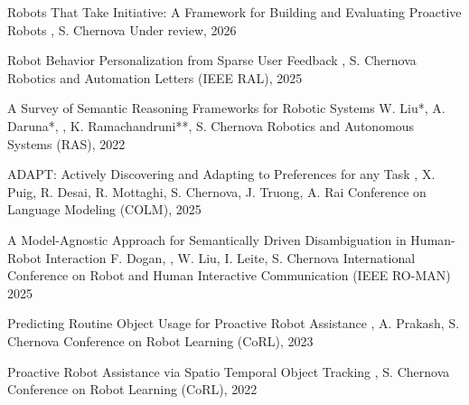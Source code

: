 

\begin{cvpubs}

  \cvpub
    {Robots That Take Initiative: A Framework for Building and Evaluating Proactive Robots} %
    {, S. Chernova} %
    {Under review, 2026} %
    {\bullet} %

  \cvpub
    {Robot Behavior Personalization from Sparse User Feedback} %
    {, S. Chernova} %
    {Robotics and Automation Letters (IEEE RAL), 2025} %
    {\bullet} %

  \cvpub
    {A Survey of Semantic Reasoning Frameworks for Robotic Systems} %
    {W. Liu*, A. Daruna*, , K. Ramachandruni**, S. Chernova} %
    {Robotics and Autonomous Systems (RAS), 2022} %
    {\bullet} %

\end{cvpubs}



\begin{cvpubs}

    \cvpub
    {ADAPT: Actively Discovering and Adapting to Preferences for any Task} %
    {, X. Puig, R. Desai, R. Mottaghi, S. Chernova, J. Truong, A. Rai} %
    {Conference on Language Modeling (COLM), 2025} %
    {\bullet}

    \cvpub
    {A Model-Agnostic Approach for Semantically Driven Disambiguation in Human-Robot Interaction} %
    {F. Dogan, , W. Liu, I. Leite, S. Chernova} %
    {International Conference on Robot and Human Interactive Communication (IEEE RO-MAN) 2025} %
    {\bullet}

   \cvpub
    {Predicting Routine Object Usage for Proactive Robot Assistance} %
    {, A. Prakash, S. Chernova} %
    {Conference on Robot Learning (CoRL), 2023} %
    {\bullet} %
    
  \cvpub
    {Proactive Robot Assistance via Spatio Temporal Object Tracking} %
    {, S. Chernova} %
    {Conference on Robot Learning (CoRL), 2022} %
    {\bullet} %


\end{cvpubs}


